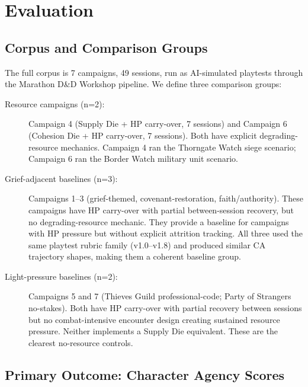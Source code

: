 
\section{Evaluation}
\label{sec:evaluation}

\subsection{Corpus and Comparison Groups}

The full corpus is 7 campaigns, 49 sessions, run as AI-simulated playtests through
the Marathon D\&D Workshop pipeline. We define three comparison groups:

\begin{description}
  \item[Resource campaigns (n=2):] Campaign 4 (Supply Die + HP carry-over, 7 sessions)
    and Campaign 6 (Cohesion Die + HP carry-over, 7 sessions). Both have explicit
    degrading-resource mechanics. Campaign 4 ran the Thorngate Watch siege scenario;
    Campaign 6 ran the Border Watch military unit scenario.

  \item[Grief-adjacent baselines (n=3):] Campaigns 1--3 (grief-themed, covenant-restoration,
    faith/authority). These campaigns have HP carry-over with partial between-session
    recovery, but no degrading-resource mechanic. They provide a baseline for campaigns
    with HP pressure but without explicit attrition tracking. All three used the same
    playtest rubric family (v1.0--v1.8) and produced similar CA trajectory shapes,
    making them a coherent baseline group.

  \item[Light-pressure baselines (n=2):] Campaigns 5 and 7 (Thieves Guild professional-code;
    Party of Strangers no-stakes). Both have HP carry-over with partial recovery between
    sessions but no combat-intensive encounter design creating sustained resource pressure.
    Neither implements a Supply Die equivalent. These are the clearest no-resource controls.
\end{description}

\subsection{Primary Outcome: Character Agency Scores}

